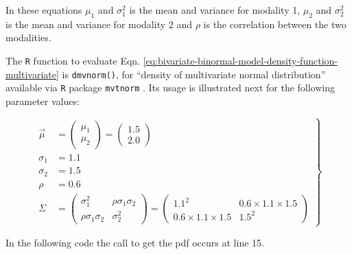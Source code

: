 \documentclass[
]{book}
\begin{document}
In these equations \(\mu_1\) and \(\sigma_1^2\) is the mean and variance for modality 1, \(\mu_2\) and \(\sigma_2^2\) is the mean and variance for modality 2 and \(\rho\) is the correlation between the two modalities.

The \texttt{R} function to evaluate Eqn. \eqref{eq:bivariate-binormal-model-density-function-multivariate} is \texttt{dmvnorm()}, for ``density of multivariate normal distribution'' available via \texttt{R} package \texttt{mvtnorm} \citep{R-mvtnorm}. Its usage is illustrated next for the following parameter values:

\begin{equation} 
\left.\begin{aligned}
\overrightarrow{
\mu}&=
\left( \begin{matrix}
\mu_1 \\
\mu_2
\end{matrix}
\right)
=\left( \begin{matrix}
1.5 \\
2.0
\end{matrix}
\right) \\
\sigma_1 &= 1.1 \\
\sigma_2 &= 1.5 \\
\rho &= 0.6 \\
\Sigma&=
\left( 
\begin{matrix}
\sigma_1^2 & \rho \sigma_1 \sigma_2 \\
\rho \sigma_1 \sigma_2  & \sigma_2^2
\end{matrix}\right)
=
\left( 
\begin{matrix}
1.1^2 & 0.6 \times 1.1 \times 1.5 \\
0.6 \times 1.1 \times 1.5  & 1.5^2
\end{matrix}\right)\end{aligned}\right\}
\label{eq:bivariate-binormal-model-parameters}
\end{equation}

In the following code the call to get the pdf occurs at line 15.
\end{document}
